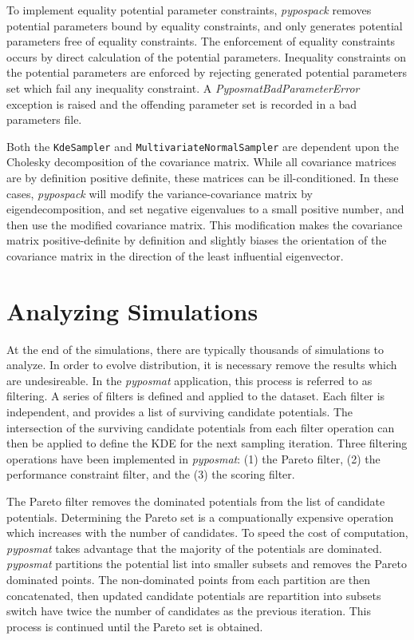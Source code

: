 To implement equality potential parameter constraints, \emph{pypospack} removes potential parameters bound by equality constraints, and only generates potential parameters free of equality constraints.  The enforcement of equality constraints occurs by direct calculation of the potential parameters.  Inequality constraints on the potential parameters are enforced by rejecting generated potential parameters set which fail any inequality constraint.  A \emph{PyposmatBadParameterError} exception is raised and the offending parameter set is recorded in a bad parameters file.

Both the \verb|KdeSampler| and \verb|MultivariateNormalSampler| are dependent upon the Cholesky decomposition of the covariance matrix.  While all covariance matrices are by definition positive definite, these matrices can be ill-conditioned.
In these cases, \emph{pypospack} will modify the variance-covariance matrix by eigendecomposition, and set negative eigenvalues to a small positive number, and then use the modified covariance matrix.
This modification makes the covariance matrix positive-definite by definition and slightly biases the orientation of the covariance matrix in the direction of the least influential eigenvector.

\section{Analyzing Simulations}
\label{sec:pypospack_analyze}
At the end of the simulations, there are typically thousands of simulations to analyze.  In order to evolve distribution, it is necessary remove the results which are undesireable.  In the \emph{pyposmat} application, this process is referred to as filtering.  A series of filters is defined and applied to the dataset.  Each filter is independent, and provides a list of surviving candidate potentials.  The intersection of the surviving candidate potentials from each filter operation can then be applied to define the KDE for the next sampling iteration.  Three filtering operations have been implemented in \emph{pyposmat}: (1) the Pareto filter, (2) the performance constraint filter, and the (3) the scoring filter.

The Pareto filter removes the dominated potentials from the list of candidate potentials.  Determining the Pareto set is a compuationally expensive operation which increases with the number of candidates.  To speed the cost of computation, \emph{pyposmat} takes advantage that the majority of the potentials are dominated.  \emph{pyposmat} partitions the potential list into smaller subsets and removes the Pareto dominated points.  The non-dominated points from each partition are then concatenated, then updated candidate potentials are repartition into subsets switch have twice the number of candidates as the previous iteration.  This process is continued until the Pareto set is obtained.

